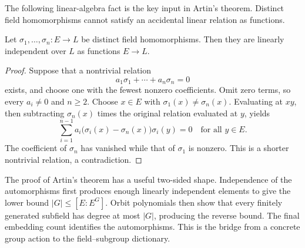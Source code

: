 The following linear-algebra fact is the key input in Artin's theorem.
Distinct field homomorphisms cannot satisfy an accidental linear relation as
functions.

\begin{lemma}\label{lem:artin-independence}
Let \(\sigma_1,\ldots,\sigma_n:E\to L\) be distinct field homomorphisms.
Then they are linearly independent over \(L\) as functions \(E\to L\).
\end{lemma}
\begin{proof}
Suppose that a nontrivial relation
\[
a_1\sigma_1+\cdots+a_n\sigma_n=0
\]
exists, and choose one with the fewest nonzero coefficients.  Omit zero
terms, so every \(a_i\ne0\) and \(n\ge2\).  Choose \(x\in E\) with
\(\sigma_1(x)\ne\sigma_n(x)\).  Evaluating at \(xy\), then subtracting
\(\sigma_n(x)\) times the original relation evaluated at \(y\), yields
\[
\sum_{i=1}^{n-1}a_i\bigl(\sigma_i(x)-\sigma_n(x)\bigr)\sigma_i(y)=0
\quad\text{for all }y\in E.
\]
The coefficient of \(\sigma_n\) has vanished while that of \(\sigma_1\) is
nonzero.  This is a shorter nontrivial relation, a contradiction.
\end{proof}

The proof of Artin's theorem has a useful two-sided shape.  Independence of
the automorphisms first produces enough linearly independent elements to give
the lower bound \(|G|\leq[E:E^G]\).  Orbit polynomials then show that every
finitely generated subfield has degree at most \(|G|\), producing the reverse
bound.  The final embedding count identifies the automorphisms.  This is the
bridge from a concrete group action to the field--subgroup dictionary.

